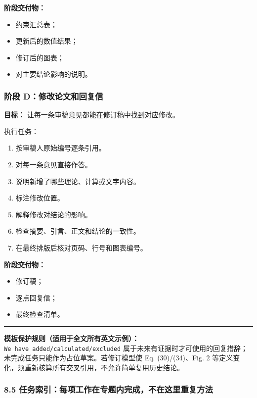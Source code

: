 \documentclass[
]{article}
\providecommand{\tightlist}{%
  \setlength{\itemsep}{0pt}\setlength{\parskip}{0pt}}
\begin{document}
\textbf{阶段交付物：}

\begin{itemize}
\tightlist
\item
  约束汇总表；
\item
  更新后的数值结果；
\item
  修订后的图表；
\item
  对主要结论影响的说明。
\end{itemize}

\subsubsection{阶段
D：修改论文和回复信}\label{ux9636ux6bb5-dux4feeux6539ux8bbaux6587ux548cux56deux590dux4fe1}

\textbf{目标：} 让每一条审稿意见都能在修订稿中找到对应修改。

执行任务：

\begin{enumerate}
\def\labelenumi{\arabic{enumi}.}
\tightlist
\item
  按审稿人原始编号逐条引用。
\item
  对每一条意见直接作答。
\item
  说明新增了哪些理论、计算或文字内容。
\item
  标注修改位置。
\item
  解释修改对结论的影响。
\item
  检查摘要、引言、正文和结论的一致性。
\item
  在最终排版后核对页码、行号和图表编号。
\end{enumerate}

\textbf{阶段交付物：}

\begin{itemize}
\tightlist
\item
  修订稿；
\item
  逐点回复信；
\item
  最终检查清单。
\end{itemize}

\begin{center}\rule{0.5\linewidth}{0.5pt}\end{center}

\textbf{模板保护规则（适用于全文所有英文示例）：}
\texttt{We\ have\ added/calculated/excluded}
属于未来有证据时才可使用的回复措辞；未完成任务只能作为占位草案。若修订模型使
Eq. (30)/(34)、Fig. 2
等定义变化，须重新核算所有交叉引用，不允许简单复用历史结论。

\subsubsection{8.5
任务索引：每项工作在专题内完成，不在这里重复方法}\label{ux4efbux52a1ux7d22ux5f15ux6bcfux9879ux5de5ux4f5cux5728ux4e13ux9898ux5185ux5b8cux6210ux4e0dux5728ux8fd9ux91ccux91cdux590dux65b9ux6cd5}
\end{document}
